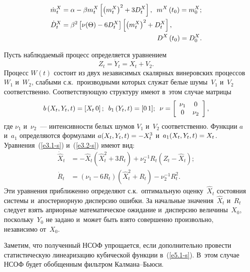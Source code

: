 \begin{multicols}{2}

\noindent
\begin{align*}
\dot m^X_t &= \alpha - \beta m_t^X \lk \left(m_t^X\right)^2 +3D_t^X\rk, \enskip 
m^X \left(t_0\right) = m_0^X;\\ %
\dot D_t^X &= \beta^2 \lk \nu(\Theta) - 6 D_t^X\rk \lk \left(m_t^X\right)^2 + D_t^X\rk, \\ 
&\hspace*{49.5mm}D^X \left(t_0\right) = D_0^X. %
\end{align*}

Пусть наблюдаемый процесс  определяется уравнением
\begin{equation*}
Z_t=\dot Y_t = X_t+V_2.
\end{equation*}
Процесс  $W(t)$  состоит из двух независимых
скалярных винеровских процессов~$W_1$ и~$W_2$, слабыми с.к.\
производными которых служат белые шумы~$V_1$ и~$V_2$
соответственно. Соответствующую структуру имеют в~этом случае
матрицы
  \begin{equation*}
    b\left(X_t,Y_t,t\right) =\left[X_t\,0\right];\enskip 
    b_1\left(Y_t,t\right) =[0\,1];\enskip
    \nu= \left[
\begin{array}{cc}
\nu_1&0\\
0&\nu_2
\end{array}
\right], %
\end{equation*}
где  $\nu_1$  и~$\nu_2$~--- интенсивности белых шумов  $V_1$ и~$V_2$ соответственно. Функции  $a$ и~$a_1$
определяются формулами $ a(X_t,Y_t,t)\hm =-X_t^3$ 
и~$a_1(X_t,Y_t,t)\hm =X_t$. Уравнения~(\ref{e3.1-s}) и~(\ref{e3.2-s}) имеют вид:
   \begin{align*}
    \dot{\hat X}_t &=- \hat X_t \left(\hat X_t^2 + 3R_t\right) +\nu_2^{-1} R_t \left(Z_t-\hat
    X_t\right);\\ %
  \dot R_t &=\left(\nu_1 - 6R_t\right) \left(\hat X_t^2 +R_t\right) -\nu_2^{-1}
    R_t^2. %
    \end{align*}
 Эти
уравнения приближенно определяют с.к.\ оптимальную оценку~$\hat X_t$
 состояния системы и~апостериорную дисперсию ошибки. За начальные
 значения~$\hat X_t$ и~$R_t$ следует взять априорные \mbox{математическое}
 ожидание и~дисперсию величины~$X_0$, поскольку~$Y_0$ не задано 
 и~может быть взято совершенно произвольно, независимо от~$X_0$.

 Заметим, что полученный НСОФ упрощается, если дополнительно провести статистическую линеаризацию
 кубической функции в~(\ref{e5.1-s}). В~этом случае НСОФ будет обобщенным фильтром Калмана--Бьюси.



\end{multicols}
